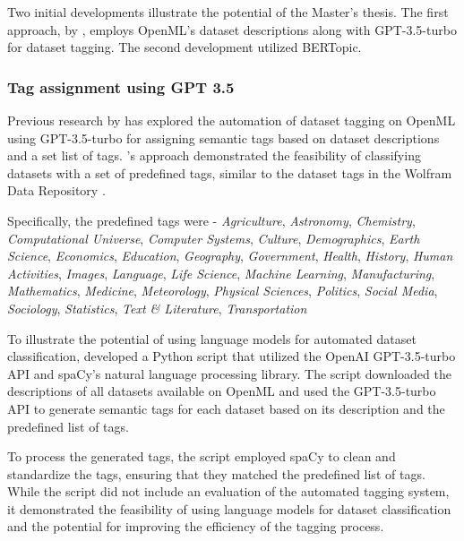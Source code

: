 \documentclass{article}
\begin{document}
Two initial developments illustrate the potential of the Master's thesis. The first approach, by \citeauthor{das_openmlscripts_nodate} \cite{das_openmlscripts_nodate}, employs OpenML's dataset descriptions along with GPT-3.5-turbo for dataset tagging. The second development utilized BERTopic.

\subsubsection{Tag assignment using GPT 3.5}

Previous research by \citeauthor{das_openmlscripts_nodate} has explored the automation of dataset tagging on OpenML using GPT-3.5-turbo for assigning semantic tags based on dataset descriptions and a set list of tags. \citeauthor{das_openmlscripts_nodate}'s approach demonstrated the feasibility of classifying datasets with a set of predefined tags, similar to the dataset tags in the Wolfram Data Repository \cite{noauthor_wolfram_nodate}.

Specifically, the predefined tags were - \textit{Agriculture}, \textit{Astronomy}, \textit{Chemistry}, \textit{Computational Universe}, \textit{Computer Systems}, \textit{Culture}, \textit{Demographics}, \textit{Earth Science}, \textit{Economics}, \textit{Education}, \textit{Geography}, \textit{Government}, \textit{Health}, \textit{History}, \textit{Human Activities}, \textit{Images}, \textit{Language}, \textit{Life Science}, \textit{Machine Learning}, \textit{Manufacturing}, \textit{Mathematics}, \textit{Medicine}, \textit{Meteorology}, \textit{Physical Sciences}, \textit{Politics}, \textit{Social Media}, \textit{Sociology}, \textit{Statistics}, \textit{Text \& Literature}, \textit{Transportation}

To illustrate the potential of using language models for automated dataset classification, \citeauthor{das_openmlscripts_nodate} developed a Python script that utilized the OpenAI GPT-3.5-turbo API and spaCy's natural language processing library. The script downloaded the descriptions of all datasets available on OpenML and used the GPT-3.5-turbo API to generate semantic tags for each dataset based on its description and the predefined list of tags.

To process the generated tags, the script employed spaCy to clean and standardize the tags, ensuring that they matched the predefined list of tags. While the script did not include an evaluation of the automated tagging system, it demonstrated the feasibility of using language models for dataset classification and the potential for improving the efficiency of the tagging process.
\end{document}
